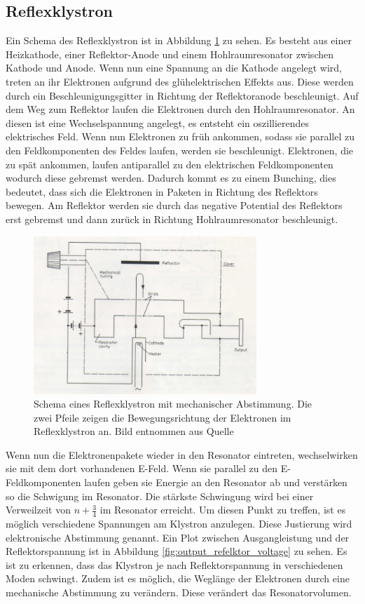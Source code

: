 \subsection{Reflexklystron}
Ein Schema des Reflexklystron ist in Abbildung \ref{fig:reflex_schema} zu sehen.
Es besteht aus einer Heizkathode, einer Reflektor-Anode und einem Hohlraumresonator zwischen Kathode und Anode.
Wenn nun eine Spannung an die Kathode angelegt wird, treten an ihr Elektronen aufgrund des glühelektrischen Effekts aus.
Diese werden durch ein Beschleunigungsgitter in Richtung der Reflektoranode beschleunigt.
Auf dem Weg zum Reflektor laufen die Elektronen durch den Hohlraumresonator.
An diesen ist eine Wechselspannung angelegt, es entsteht ein oszillierendes elektrisches Feld.
Wenn nun Elektronen zu früh ankommen, sodass sie parallel zu den Feldkomponenten des Feldes laufen, werden sie beschleunigt.
Elektronen, die zu spät ankommen, laufen antiparallel zu den elektrischen Feldkomponenten wodurch diese gebremst werden.
Dadurch kommt es zu einem Bunching, dies bedeutet, dass sich die Elektronen in Paketen in Richtung des Reflektors bewegen.
Am Reflektor werden sie durch das negative Potential des Reflektors erst gebremst und dann zurück in Richtung Hohlraumresonator beschleunigt.
\begin{figure}
    \centering
    \includegraphics[width=0.75\textwidth]{content/data/reflex_klystron_schema.png}
    \caption{Schema eines Reflexklystron mit mechanischer Abstimmung. Die zwei Pfeile zeigen die Bewegungsrichtung der Elektronen im Reflexklystron an. Bild entnommen aus Quelle \cite[6]{Anleitung}}
    \label{fig:reflex_schema}
\end{figure}
\FloatBarrier
Wenn nun die Elektronenpakete wieder in den Resonator eintreten, wechselwirken sie mit dem dort vorhandenen E-Feld.
Wenn sie parallel zu den E-Feldkomponenten laufen geben sie Energie an den Resonator ab und verstärken so die Schwigung im Resonator.
Die stärkste Schwingung wird bei einer Verweilzeit von $n + \frac{3}{4}$ im Resonator erreicht.
Um diesen Punkt zu treffen, ist es möglich verschiedene Spannungen am Klystron anzulegen.
Diese Justierung wird elektronische Abstimmung genannt.
Ein Plot zwischen Ausgangleistung und der Reflektorspannung ist in Abbildung \ref{fig:output_refelktor_voltage} zu sehen.
Es ist zu erkennen, dass das Klystron je nach Reflektorspannung in verschiedenen Moden schwingt.
Zudem ist es möglich, die Weglänge der Elektronen durch eine mechanische Abstimmung zu verändern.
Diese verändert das Resonatorvolumen.


